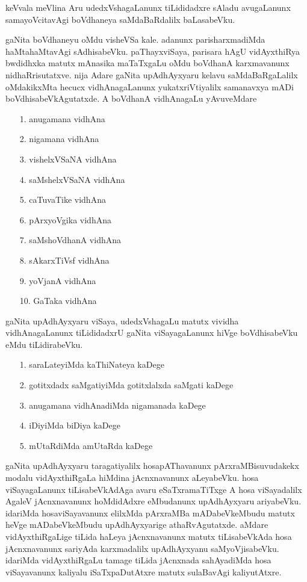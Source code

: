 keVvala meVlina Aru udedxVshagaLanunx tiLididadxre sAladu avugaLanunx sama\-yoVcitavAgi boVdhaneya saMdaBaRdalilx baLasabeVku.

gaNita boVdhaneyu oMdu visheVSa kale. adanunx parisharxmadiMda haMtahaMtavAgi sAdhisabeVku. paThayxviSaya,  parisara hAgU vidAyxthiRya bwdidhxka matutx mAnasika maTaTxgaLu oMdu boVdhanA karxmavanunx nidhaRrisutatxve. nija Adare gaNita upAdhAyxyaru kelavu saMdaBaRgaLalilx oMdakikxMta hecucx vidhAnagaLanunx yukatxriVtiyalilx samanavxya mADi boVdhisabeVkAgutatxde. A boVdhanA vidhAnagaLu yAvuveMdare
\begin{enumerate}
\item[{\rm 1.}] anugamana vidhAna
\item[{\rm 2.}] nigamana vidhAna
\item[{\rm 3.}] vishelxVSaNA vidhAna
\item[{\rm 4.}] saMshelxVSaNA vidhAna
\item[{\rm 5.}] caTuvaTike vidhAna
\item[{\rm 6.}] pArxyoVgika vidhAna
\item[{\rm 7.}] saMshoVdhanA vidhAna
\item[{\rm 8.}] sAkarxTiVsf vidhAna
\item[{\rm 9.}] yoVjanA vidhAna
\item[{\rm 10.}] GaTaka vidhAna
\end{enumerate}

gaNita upAdhAyxyaru viSaya, udedxVshagaLu matutx vividha vidhAnagaLanunx tiLididadxrU gaNita viSayagaLanunx hiVge boVdhisabeVku eMdu tiLidirabeVku.
\begin{enumerate}
\item[{\rm 1.}] saraLateyiMda kaThiNateya kaDege
\item[{\rm 2.}] gotitxdadx saMgatiyiMda gotitxlalxda saMgati kaDege
\item[{\rm 3.}] anugamana vidhAnadiMda nigamanada kaDege
\item[{\rm 4.}] iDiyiMda biDiya kaDege
\item[{\rm 5.}] mUtaRdiMda amUtaRda kaDege
\end{enumerate}

gaNita upAdhAyxyaru taragatiyalilx hosapAThavanunx pArxraMBisuvudakekx modalu vidAyxthiRgaLa hiMdina jAcnxnavanunx aLeyabeVku. hosa viSayagaLanunx tiLisabeVkAdAga avaru eSaTxramaTiTxge A hosa viSayadalilx AgaleV jAcnxnavanunx hoMdidAdxre eMbudanunx upAdhAyxyaru ariyabeVku. idariMda hosaviSayavanunx elilxMda pArxraMBa mADabeVkeMbudu matutx heVge mADabeVkeMbudu upAdhAyxyarige athaRvAgutatxde. aMdare vidAyxthiRgaLige tiLida haLeya jAcnxnavanunx matutx tiLisabeVkAda hosa jAcnxnavanunx sariyAda karxmadalilx upAdhAyxyanu saMyoVjisabeVku. idariMda vidAyxthiRgaLu tamage tiLida jAcnxnada sahAyadiMda hosa viSayavanunx kaliyalu iSaTxpaDutAtxre matutx sulaBavAgi kaliyutAtxre.

